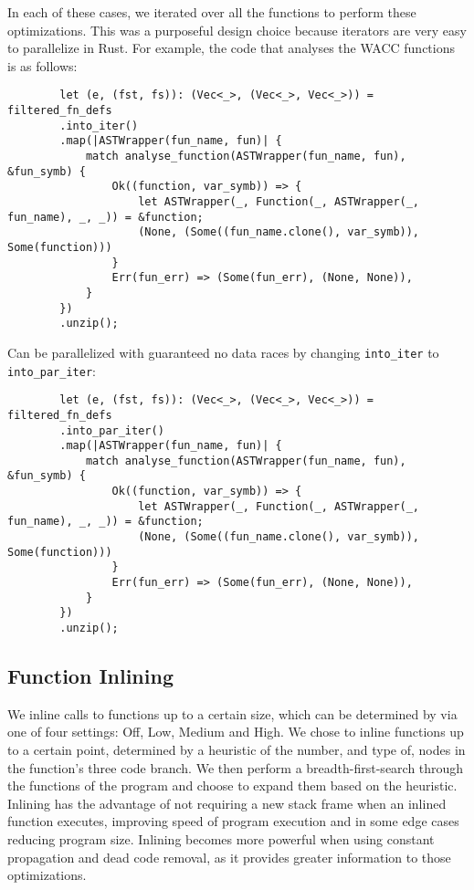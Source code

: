 \documentclass{article}
\begin{document}
        In each of these cases, we iterated over all the functions to perform these optimizations. This was a purposeful design choice because iterators are very easy to parallelize in Rust. 
        For example, the code that analyses the WACC functions is as follows:
        \begin{verbatim}
        let (e, (fst, fs)): (Vec<_>, (Vec<_>, Vec<_>)) = filtered_fn_defs
        .into_iter()
        .map(|ASTWrapper(fun_name, fun)| {
            match analyse_function(ASTWrapper(fun_name, fun), &fun_symb) {
                Ok((function, var_symb)) => {
                    let ASTWrapper(_, Function(_, ASTWrapper(_, fun_name), _, _)) = &function;
                    (None, (Some((fun_name.clone(), var_symb)), Some(function)))
                }
                Err(fun_err) => (Some(fun_err), (None, None)),
            }
        })
        .unzip();
        \end{verbatim}
        Can be parallelized with guaranteed no data races by changing \texttt{into_iter} to  \texttt{into_par_iter}:
        \begin{verbatim}
        let (e, (fst, fs)): (Vec<_>, (Vec<_>, Vec<_>)) = filtered_fn_defs
        .into_par_iter()
        .map(|ASTWrapper(fun_name, fun)| {
            match analyse_function(ASTWrapper(fun_name, fun), &fun_symb) {
                Ok((function, var_symb)) => {
                    let ASTWrapper(_, Function(_, ASTWrapper(_, fun_name), _, _)) = &function;
                    (None, (Some((fun_name.clone(), var_symb)), Some(function)))
                }
                Err(fun_err) => (Some(fun_err), (None, None)),
            }
        })
        .unzip();
        \end{verbatim}
        
        \subsection*{Function Inlining}
        We inline calls to functions up to a certain size, which can be determined by via one of four settings: Off, Low, Medium and High. We chose to inline functions up to a certain point, determined by a heuristic of the number, and type of, nodes in the function's three code branch. We then perform a breadth-first-search through the functions of the program and choose to expand them based on the heuristic. Inlining has the advantage of not requiring a new stack frame when an inlined function executes, improving speed of program execution and in some edge cases reducing program size. Inlining becomes more powerful when using constant propagation and dead code removal, as it provides greater information to those optimizations.
        
\end{document}
